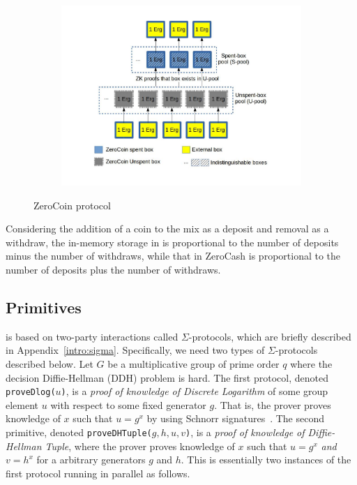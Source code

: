 \documentclass[runningheads]{llncs}
\begin{document}
\begin{figure}
	\centering
	\begin{subfigure}{.8\textwidth}
		\centering
		\includegraphics[width=\linewidth]{ZeroCoin.jpg}
	\end{subfigure}
	\caption{ZeroCoin protocol}
	\label{fig:zerocoin}
\end{figure}

Considering the addition of a coin to the mix as a deposit and removal as a withdraw, the in-memory storage in \algname is proportional to the number of deposits minus the number of withdraws, while that in ZeroCash is proportional to the number of deposits plus the number of withdraws.  


\subsection{Primitives} 

\algname is based on two-party interactions called $\Sigma$-protocols, which are briefly described in Appendix~\ref{intro:sigma}. 
Specifically, we need two types of $\Sigma$-protocols described below. Let $G$ be a multiplicative group of prime order $q$ where the decision Diffie-Hellman (DDH) problem is hard. The first protocol, denoted \texttt{proveDlog($u$)}, is a {\em proof of knowledge of Discrete Logarithm} of some group element $u$ with respect to some fixed generator $g$. That is, the prover proves knowledge of $x$ such that $u = g^x$ by using Schnorr signatures~\cite{Sch91}. %
The second primitive, denoted \texttt{proveDHTuple($g, h, u, v$)}, is a {\em proof of knowledge of Diffie-Hellman Tuple}, where the prover proves knowledge of $x$ such that $u = g^x$ {\em and} $v = h^x$ for a arbitrary generators $g$ and $h$. This is essentially two instances of the first protocol running in parallel as follows.
\end{document}
